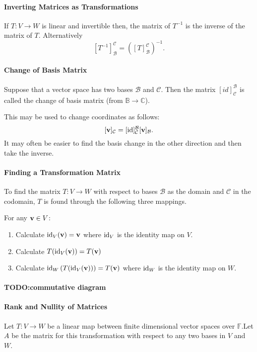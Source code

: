\paragraph{Inverting Matrices as Transformations}
If \(T: V \to W\) is linear and invertible then, the matrix of \(T^{-1}\)
is the inverse of the matrix of \(T\).
Alternatively \[
    [T^{-1}]_\mathcal{B}^\mathcal{C}
    =
    \left( [T]_\mathcal{B}^\mathcal{C} \right)^{-1}
.\]

\paragraph{Change of Basis Matrix}
Suppose that a vector space has two bases \(\mathcal{B}\) and \(\mathcal{C}\).
Then the matrix \([id]_\mathcal{C}^\mathcal{B}\) is called the
change of basis matrix (from \(\mathbb{B} \to \mathbb{C}\)).

This may be used to change coordinates as follows: \[
    [\mathbf{v}]_\mathcal{C}
    =
    [\mathrm{id}]_\mathcal{C}^\mathcal{B} [\mathbf{v}]_\mathcal{B}
.\]
It may often be easier to find the basis change in the other direction and
then take the inverse.

\paragraph{Finding a Transformation Matrix}
To find the matrix \(T: V \to W\) with respect to bases \(\mathcal{B}\)
as the domain and \(\mathcal{C}\) in the codomain, \(T\) is found through the
following three mappings.

For any  \(\mathbf{v} \in V\):
\begin{enumerate}
    \item Calculate \(\mathrm{id}_V (\mathbf{v}) = \mathbf{v}\) where \(\mathrm{id}_V\) is the identity
        map on \(V\).
    \item Calculate \(T(\mathrm{id}_V(\mathbf{v})) = T(\mathbf{v}) \)
    \item Calculate \(
        \mathrm{id}_W \left( T (\mathrm{id}_V(\mathbf{v})) \right) = T(\mathbf{v})\)
        where \(\mathrm{id}_W\) is the identity map on \(W\).
\end{enumerate}

\paragraph{TODO:\@ commutative diagram}

\paragraph{Rank and Nullity of Matrices}
Let \(T: V \to W\) be a linear map between finite dimensional vector spaces
over \(\mathbb{F}\).Let \(A\) be the matrix for this transformation
with respect to any two bases in \(V\) and \(W\).

